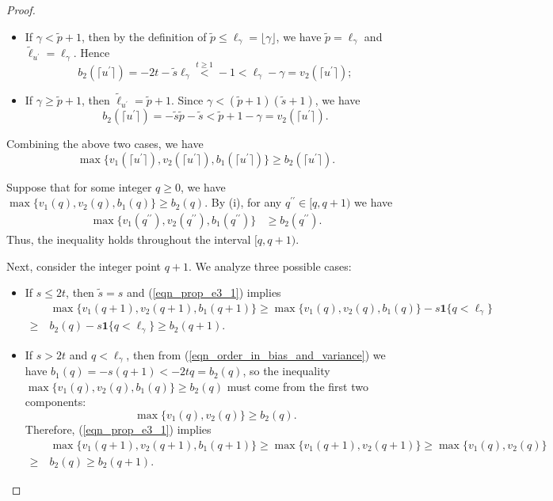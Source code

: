 \documentclass{article}
\theoremstyle{plain}
\theoremstyle{definition}
\theoremstyle{remark}
\begin{document}
\begin{appendix}
\begin{proof}
\begin{itemize}
    \item If $\gamma < \tilde{p}+1$, then by the definition of $\tilde{p} \leq \ell_{\gamma} = \lfloor \gamma \rfloor$, we have $\tilde{p}=\ell_{\gamma}$ and $\tilde{\ell}_{u^{\prime}} = \ell_{\gamma}$. Hence
$$
b_2(\lceil u^{\prime} \rceil) = -2  t - \tilde{s}\ell_{\gamma} \overset{t \geq 1}{<} -1 < \ell_{\gamma} - \gamma = v_2(\lceil u^{\prime} \rceil);
$$

    \item If $\gamma \geq \tilde{p}+1$, then $\tilde{\ell}_{u^{\prime}} = \tilde{p}+1$.
    Since $\gamma<(\tilde{p}+1)(\tilde{s}+1)$, we have
$$
b_2(\lceil u^{\prime} \rceil) = -\tilde{s}\tilde{p}-\tilde{s} < \tilde{p}+1-\gamma = v_2(\lceil u^{\prime} \rceil).
$$
\end{itemize}
Combining the above two cases, we have
$$
        \max\{v_1(\lceil u^{\prime} \rceil), v_2(\lceil u^{\prime} \rceil), b_1(\lceil u^{\prime} \rceil)\} \geq b_2(\lceil u^{\prime} \rceil). 
        $$





Suppose that for some integer $q \geq 0$, we have $\max\{v_1(q), v_2(q), b_1(q)\} \geq b_2(q)$. 
By (i), for any $q^{\prime \prime}\in[q, q+1)$ we have
\begin{align}\label{eqn_step_1}
  \max\{v_1(q^{\prime \prime}), v_2(q^{\prime \prime}), b_1(q^{\prime \prime})\} &\geq  b_2(q^{\prime \prime}).
\end{align}
Thus, the inequality holds throughout the interval $[q, q+1)$.



Next, consider the integer point $q+1$. We analyze three possible cases:
\begin{itemize}
    \item If $s \leq 2 t$, then $\tilde{s}=s$ and (\ref{eqn_prop_e3_1}) implies 
    \begin{align*}
        &~ \max\{v_1(q+1), v_2(q+1), b_1(q+1)\} \geq \max\{v_1(q), v_2(q), b_1(q)\} - s\mathbf{1}\{q < \ell_{\gamma}\}\\
        \geq &~ b_2(q) - s\mathbf{1}\{q < \ell_{\gamma}\} \geq b_2(q+1).
    \end{align*}
    
    \item If $s>2t$ and $q < \ell_{\gamma}$, then from (\ref{eqn_order_in_bias_and_variance}) we have $b_1(q)=-s(q+1) < -2t q = b_2(q)$, so the inequality $\max\{v_1(q), v_2(q), b_1(q)\} \geq b_2(q)$ must come from the first two components:
    $$
        \max\{v_1(q), v_2(q)\} \geq b_2(q).
    $$
    Therefore, (\ref{eqn_prop_e3_1}) implies
    \begin{align*}
        &~ \max\{v_1(q+1), v_2(q+1), b_1(q+1)\} \geq \max\{v_1(q+1), v_2(q+1)\} \geq \max\{v_1(q), v_2(q)\}\\
        \geq &~ b_2(q) \geq b_2(q+1).
    \end{align*}


\end{itemize}
\end{proof}
\end{appendix}
\end{document}
